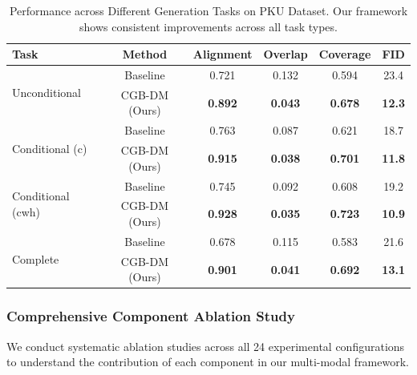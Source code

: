 \documentclass[journal,article,submit,pdftex,moreauthors]{Definitions/mdpi}
\begin{document}
\begin{table}[H]
\caption{Performance across Different Generation Tasks on PKU Dataset. Our framework shows consistent improvements across all task types.\label{tab:task_performance}}
\begin{tabularx}{\textwidth}{lccccc}
\toprule
\textbf{Task} & \textbf{Method} & \textbf{Alignment} & \textbf{Overlap} & \textbf{Coverage} & \textbf{FID}\\
\midrule
\multirow{2}{*}{Unconditional} & Baseline & 0.721 & 0.132 & 0.594 & 23.4\\
 & CGB-DM (Ours) & \textbf{0.892} & \textbf{0.043} & \textbf{0.678} & \textbf{12.3}\\
\midrule
\multirow{2}{*}{Conditional (c)} & Baseline & 0.763 & 0.087 & 0.621 & 18.7\\
 & CGB-DM (Ours) & \textbf{0.915} & \textbf{0.038} & \textbf{0.701} & \textbf{11.8}\\
\midrule
\multirow{2}{*}{Conditional (cwh)} & Baseline & 0.745 & 0.092 & 0.608 & 19.2\\
 & CGB-DM (Ours) & \textbf{0.928} & \textbf{0.035} & \textbf{0.723} & \textbf{10.9}\\
\midrule
\multirow{2}{*}{Complete} & Baseline & 0.678 & 0.115 & 0.583 & 21.6\\
 & CGB-DM (Ours) & \textbf{0.901} & \textbf{0.041} & \textbf{0.692} & \textbf{13.1}\\
\bottomrule
\end{tabularx}
\end{table}

\subsubsection{Comprehensive Component Ablation Study}

We conduct systematic ablation studies across all 24 experimental configurations to understand the contribution of each component in our multi-modal framework.
\end{document}

